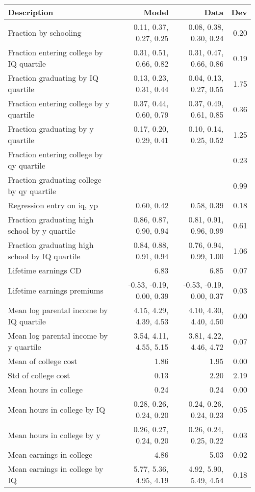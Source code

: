 \begin{tabular}{lrrr}
\hline
Description & Model  & Data  & Dev  \\ 
\hline
Fraction by schooling & 0.11, 0.37, 0.27, 0.25  & 0.08, 0.38, 0.30, 0.24  & 0.20  \\ 
Fraction entering college by IQ quartile & 0.31, 0.51, 0.66, 0.82  & 0.31, 0.47, 0.66, 0.86  & 0.19  \\ 
Fraction graduating by IQ quartile & 0.13, 0.23, 0.31, 0.44  & 0.04, 0.13, 0.27, 0.55  & 1.75  \\ 
Fraction entering college by y quartile & 0.37, 0.44, 0.60, 0.79  & 0.37, 0.49, 0.61, 0.85  & 0.36  \\ 
Fraction graduating by y quartile & 0.17, 0.20, 0.29, 0.41  & 0.10, 0.14, 0.25, 0.52  & 1.25  \\ 
Fraction entering college by qy quartile &   &   & 0.23  \\ 
Fraction graduating college by qy quartile &   &   & 0.99  \\ 
Regression entry on iq, yp & 0.60, 0.42  & 0.58, 0.39  & 0.18  \\ 
Fraction graduating high school by y quartile & 0.86, 0.87, 0.90, 0.94  & 0.81, 0.91, 0.96, 0.99  & 0.61  \\ 
Fraction graduating high school by IQ quartile & 0.84, 0.88, 0.91, 0.94  & 0.76, 0.94, 0.99, 1.00  & 1.06  \\ 
Lifetime earnings CD & 6.83  & 6.85  & 0.07  \\ 
Lifetime earnings premiums & -0.53, -0.19, 0.00, 0.39  & -0.53, -0.19, 0.00, 0.37  & 0.03  \\ 
Mean log parental income by IQ quartile & 4.15, 4.29, 4.39, 4.53  & 4.10, 4.30, 4.40, 4.50  & 0.00  \\ 
Mean log parental income by y quartile & 3.54, 4.11, 4.55, 5.15  & 3.81, 4.22, 4.46, 4.72  & 0.07  \\ 
Mean of college cost & 1.86  & 1.95  & 0.00  \\ 
Std of college cost & 0.13  & 2.20  & 2.19  \\ 
Mean hours in college & 0.24  & 0.24  & 0.00  \\ 
Mean hours in college by IQ & 0.28, 0.26, 0.24, 0.20  & 0.24, 0.26, 0.24, 0.23  & 0.05  \\ 
Mean hours in college by y & 0.26, 0.27, 0.24, 0.20  & 0.26, 0.24, 0.25, 0.22  & 0.03  \\ 
Mean earnings in college & 4.86  & 5.03  & 0.02  \\ 
Mean earnings in college by IQ & 5.77, 5.36, 4.95, 4.19  & 4.92, 5.90, 5.49, 4.54  & 0.18  \\ 

\end{tabular}
